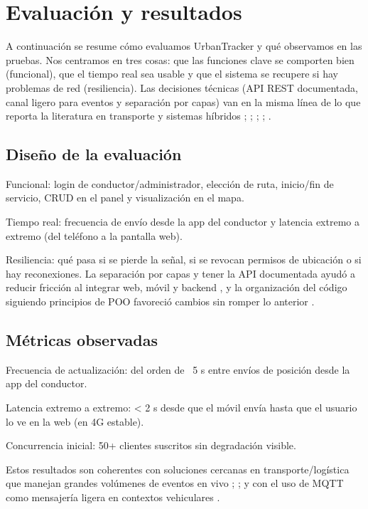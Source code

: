 \section{Evaluación y resultados}
A continuación se resume cómo evaluamos UrbanTracker y qué observamos en las pruebas. Nos centramos en tres cosas: que las funciones clave se comporten bien (funcional), que el tiempo real sea usable y que el sistema se recupere si hay problemas de red (resiliencia). Las decisiones técnicas (API REST documentada, canal ligero para eventos y separación por capas) van en la misma línea de lo que reporta la literatura en transporte y sistemas híbridos \cite{cityruta2018new}; \cite{stopbus2016new}; \cite{sismo2016}; \cite{easyrest2022}; \cite{ingenieria2022}.

\subsection{Diseño de la evaluación}
Funcional: login de conductor/administrador, elección de ruta, inicio/fin de servicio, CRUD en el panel y visualización en el mapa.

Tiempo real: frecuencia de envío desde la app del conductor y latencia extremo a extremo (del teléfono a la pantalla web).

Resiliencia: qué pasa si se pierde la señal, si se revocan permisos de ubicación o si hay reconexiones.
La separación por capas y tener la API documentada ayudó a reducir fricción al integrar web, móvil y backend \cite{easyrest2022}, y la organización del código siguiendo principios de POO favoreció cambios sin romper lo anterior \cite{poo2023}.

\subsection{Métricas observadas}
Frecuencia de actualización: del orden de ~5 s entre envíos de posición desde la app del conductor.

Latencia extremo a extremo: < 2 s desde que el móvil envía hasta que el usuario lo ve en la web (en 4G estable).

Concurrencia inicial: 50+ clientes suscritos sin degradación visible.

Estos resultados son coherentes con soluciones cercanas en transporte/logística que manejan grandes volúmenes de eventos en vivo \cite{torres2020}; \cite{odesanya2025}; \cite{anyango2025} y con el uso de MQTT como mensajería ligera en contextos vehiculares \cite{sismo2016}.

